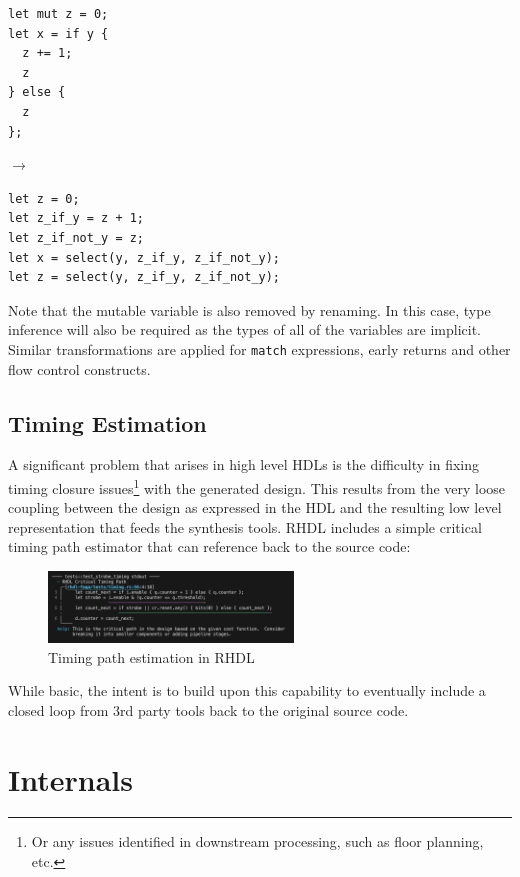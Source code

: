 \documentclass[sigplan,screen,sigconf]{acmart}
\begin{document}
\begin{center}
  \begin{minipage}{0.25\linewidth}
    \begin{verbatim}
let mut z = 0;
let x = if y {
  z += 1;
  z
} else {
  z
};
    \end{verbatim}
  \end{minipage}
    $\rightarrow$
    \begin{minipage}{0.57\linewidth}
  \begin{verbatim}
let z = 0;
let z_if_y = z + 1;
let z_if_not_y = z;
let x = select(y, z_if_y, z_if_not_y);
let z = select(y, z_if_y, z_if_not_y);
  \end{verbatim}
\end{minipage}
\end{center}
Note that the mutable variable is also removed by renaming.  In this case, type inference will also be required as the types of all of the variables are implicit.  Similar transformations are applied for \verb|match| expressions, early returns and other flow control constructs.

\subsection{Timing Estimation}
A significant problem that arises in high level HDLs is the difficulty in fixing timing closure issues\footnote{Or any issues identified in downstream processing, such as floor planning, etc.} with the generated design.  This results from the very loose coupling between the design as expressed in the HDL and the resulting low level representation that feeds the synthesis tools.  RHDL includes a simple critical timing path estimator that can reference back to the source code:

\begin{figure}[h]
  \centering
  \includegraphics[width=6.5cm]{timing.png}
  \caption{Timing path estimation in RHDL}
\end{figure}

While basic, the intent is to build upon this capability to eventually include a closed loop from 3rd party tools back to the original source code.

\section{Internals}
\end{document}
